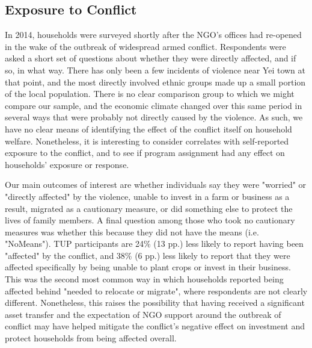 \documentclass[12pt,article]{article}
\begin{document}
\subsection{Exposure to Conflict}
\label{sec-3-7}

In 2014, households were surveyed shortly after the NGO's offices had re-opened in
the wake of the outbreak of widespread armed conflict. Respondents were asked a short
set of questions about whether they were directly affected, and if so, in what way.
There has only been a few incidents of violence near Yei town at that point, and the most
directly involved ethnic groups made up a small portion of the local population. There
is no clear comparison group to which we might compare our sample, and the economic
climate changed over this same period in several ways that were probably not directly
caused by the violence. As such, we have no clear means of identifying the effect of
the conflict itself on household welfare. Nonetheless, it is interesting to consider
correlates with self-reported exposure to the conflict, and to see if program
assignment had any effect on households' exposure or response.

Our main outcomes of interest are whether individuals say they were "worried" or
"directly affected" by the violence, unable to invest in a farm or business as a
result, migrated as a cautionary measure, or did something else to protect the lives
of family members. A final question among those who took no cautionary measures was
whether this because they did not have the means (i.e. "NoMeans"). TUP participants
are 24\% (13 pp.) less likely to report having been "affected" by the conflict, and
38\% (6 pp.) less likely to report that they were affected specifically by being
unable to plant crops or invest in their business. This was the second most common
way in which households reported being affected behind "needed to relocate or
migrate", where respondents are not clearly different. Nonetheless, this raises the
possibility that having received a significant asset transfer and the expectation of
NGO support around the outbreak of
conflict may have helped mitigate the conflict's negative effect on investment and
protect households from being affected overall.
\end{document}
